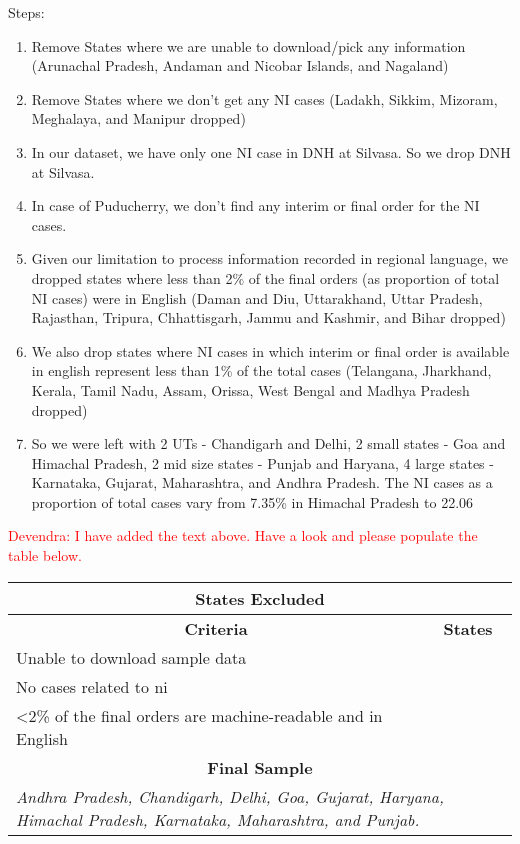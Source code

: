 Steps: 
\begin{enumerate}
\item Remove States where we are unable to download/pick any information (Arunachal Pradesh, Andaman and Nicobar Islands, and Nagaland)
\item Remove States where we don't get any NI cases (Ladakh, Sikkim, Mizoram, Meghalaya, and Manipur dropped)
\item In our dataset, we have only one NI case in DNH at Silvasa. So we drop DNH at Silvasa.
\item In case of Puducherry, we don't find any interim or final order for the NI cases.
\item Given our limitation to process information recorded in regional language, we dropped states where less than 2\% of the final orders (as proportion of total NI cases) were in English (Daman and Diu, Uttarakhand, Uttar Pradesh, Rajasthan, Tripura, Chhattisgarh, Jammu and Kashmir, and Bihar dropped)
\item We also drop states where NI cases in which interim or final order is available in english represent less than 1\% of the total cases (Telangana, Jharkhand, Kerala, Tamil Nadu, Assam, Orissa, West Bengal and Madhya Pradesh dropped)
\item So we were left with 2 UTs - Chandigarh and Delhi, 2 small states - Goa and Himachal Pradesh, 2 mid size states - Punjab and Haryana, 4 large states - Karnataka, Gujarat, Maharashtra, and Andhra Pradesh. The NI cases as a proportion of total cases vary from 7.35\% in Himachal Pradesh to 22.06%
\end{enumerate}

\textcolor{red}{Devendra: I have added the text above. Have a look and please populate the table below.}

\begin{longtable}{p{}p{}}
\label{tab:sample_selection}
\\
\toprule
\multicolumn{2}{c}{\textbf{States Excluded}} \\ \midrule
\multicolumn{1}{c|}{\textbf{Criteria}} & \multicolumn{1}{c}{\textbf{States}} \\ \midrule
\multicolumn{1}{p{0.32\textwidth}|}{Unable to download sample data} & \\ \midrule
\multicolumn{1}{p{0.32\textwidth}|}{No cases related to \gls{ni}} & \\ \midrule
\multicolumn{1}{p{0.32\textwidth}|}{\textless 2\% of the final orders are machine-readable and in English} & \\ \midrule
\multicolumn{2}{c}{\textbf{Final Sample}} \\ \midrule
 \multicolumn{2}{p{0.92\textwidth}}{\textit{Andhra Pradesh, Chandigarh, Delhi, Goa, Gujarat, Haryana, Himachal Pradesh, Karnataka, Maharashtra, and Punjab.}} \\ \bottomrule
\end{longtable}

